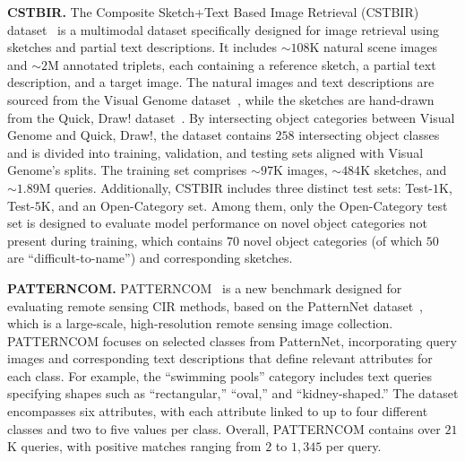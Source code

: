 \textbf{CSTBIR.} The Composite Sketch+Text Based Image Retrieval (CSTBIR) dataset~\cite{stnet} is a multimodal dataset specifically designed for image retrieval using sketches and partial text descriptions. It includes $\sim108$K natural scene images and $\sim2$M annotated triplets, each containing a reference sketch, a partial text description, and a target image. The natural images and text descriptions are sourced from the Visual Genome dataset~\cite{krishna2017visual}, while the sketches are hand-drawn from the Quick, Draw! dataset~\cite{HaE18}. By intersecting object categories between Visual Genome and Quick, Draw!, the dataset contains $258$ intersecting object classes and is divided into training, validation, and testing sets aligned with Visual Genome’s splits. The training set comprises $\sim97$K images, $\sim484$K sketches, and $\sim1.89$M queries. Additionally, CSTBIR includes three distinct test sets: Test-$1$K, Test-$5$K, and an Open-Category set. Among them, only the Open-Category test set is designed to evaluate model performance on novel object categories not present during training, which contains $70$ novel object categories (of which $50$ are “difficult-to-name”) and corresponding sketches. 



\textbf{PATTERNCOM.} PATTERNCOM~\cite{psomas2024cir4rs} is a new benchmark designed for evaluating remote sensing CIR methods, based on the PatternNet dataset~\cite{zhou2018patternnet}, which is a large-scale, high-resolution remote sensing image collection. PATTERNCOM focuses on selected classes from PatternNet, incorporating query images and corresponding text descriptions that define relevant attributes for each class. For example, the ``swimming pools'' category includes text queries specifying shapes such as ``rectangular,'' ``oval,'' and ``kidney-shaped.'' The dataset encompasses six attributes, with each attribute linked to up to four different classes and two to five values per class. Overall, PATTERNCOM contains over $21$K queries, with positive matches ranging from $2$ to $1,345$ per query. 


